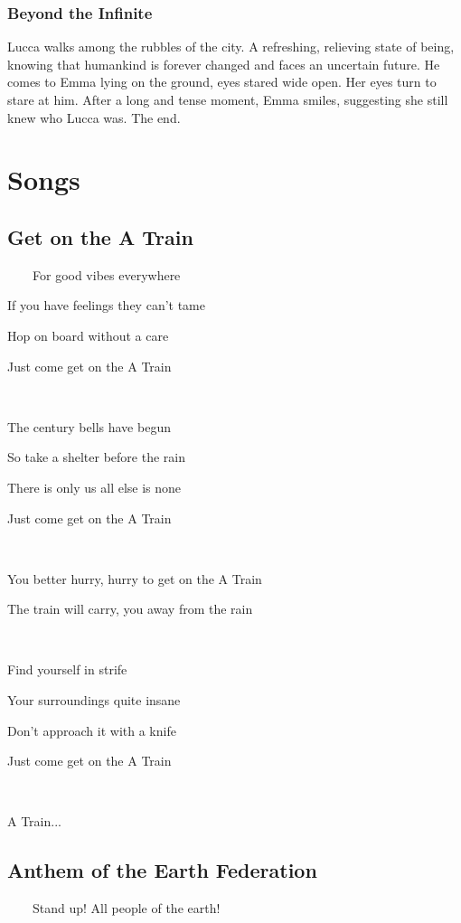 \documentclass[11pt]{article}
\begin{document}
		\subsubsection{Beyond the Infinite}
		Lucca walks among the rubbles of the city.
		A refreshing, relieving state of being, knowing that humankind is forever changed and faces an uncertain future. 
		He comes to Emma lying on the ground, eyes stared wide open. 
		Her eyes turn to stare at him.
		After a long and tense moment, Emma smiles, suggesting she still knew who Lucca was. 
		The end.
\newpage








\section{Songs}
	\subsection{Get on the A Train}
	\ \ \ \ For good vibes everywhere
	
	If you have feelings they can't tame
	
	Hop on board without a care
	
	Just come get on the A Train
	
	\ 
	
	The century bells have begun

	So take a shelter before the rain

	There is only us all else is none

	Just come get on the A Train

	\ 
		
	You better hurry, hurry to get on the A Train

	The train will carry, you away from the rain
	
	\ 
	
	Find yourself in strife
	
	Your surroundings quite insane
	
	Don't approach it with a knife
	
	Just come get on the A Train
	
	\ 
	
	A Train...
	\newpage

	\subsection{Anthem of the Earth Federation}
	\ \ \ \ Stand up! All people of the earth!
	
\end{document}
